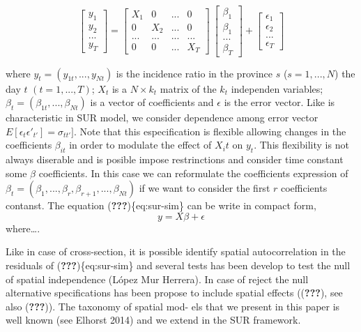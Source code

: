 \documentclass[]{elsarticle} %
\begin{document}
\begin{equation}
\begin{bmatrix}
y_1 \\ y_2 \\ ... \\ y_T
\end{bmatrix}
=
\begin{bmatrix}
X_1 & 0 & ... & 0 \\ 0 & X_2 & ... & 0 \\ ... & ... & ... & ... \\ 0 & 0 & ... & X_T
\end{bmatrix}
\
\begin{bmatrix}
\beta_1 \\ \beta_1 \\ ... \\ \beta_T
\end{bmatrix}
+
\begin{bmatrix}
\epsilon_1 \\ \epsilon_2 \\ ... \\ \epsilon_T
\end{bmatrix}
\label{eq:sur-sim}
\end{equation}

where \(y_{t}=(y_{1t},...,y_{Nt})\) is the incidence ratio in the
province \(s\) (\(s=1,...,N\)) the day \(t\) \((t=1,...,T)\); \(X_t\) is
a \(N \times k_t\) matrix of the \(k_t\) independen variables;
\(\beta_t=(\beta_{1t},...,\beta_{Nt})\) is a vector of coefficients and
\(\epsilon\) is the error vector. Like is characteristic in SUR model,
we consider dependence among error vector
\(E[\epsilon_t \epsilon'_{t'}]=\sigma_{tt'}]\). Note that this
especification is flexible allowing changes in the coefficients
\(\beta_{it}\) in order to modulate the effect of \(X_it\) on \(y_t\).
This flexibility is not always diserable and is posible impose
restrinctions and consider time constant some \(\beta\) coefficients. In
this case we can reformulate the coefficients expression of
\(\beta_t=(\beta_{1},...,\beta_{r},\beta_{r+1},...,\beta_{Nt})\) if we
want to consider the first \(r\) coefficients contanst. The equation
({\textbf{???}})\{eq:sur-sim\} can be write in compact form,
\begin{equation}
y = X \beta + \epsilon
\end{equation} where\ldots.

Like in case of cross-section, it is possible identify spatial
autocorrelation in the residuals of ({\textbf{???}})\{eq:sur-sim\} and
several tests has been develop to test the null of spatial independence
(López Mur Herrera). In case of reject the null alternative
specifications has been propose to include spatial effects
(({\textbf{???}}), see also ({\textbf{???}})). The taxonomy of spatial
mod- els that we present in this paper is well known (see Elhorst 2014)
and we extend in the SUR framework.
\end{document}
